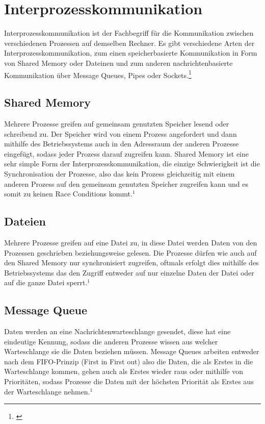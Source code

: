 \newpage
\section{Interprozesskommunikation}
Interprozesskommunikation ist der Fachbegriff für die Kommunikation zwischen verschiedenen Prozessen auf demselben Rechner. Es gibt verschiedene Arten der Interprozesskommunikation, zum einen speicherbasierte Kommunikation in Form von Shared Memory oder Dateinen und zum anderen nachrichtenbasierte Kommunikation über Message Queues, Pipes oder Sockets.\footnote[1]{\cite[Vgl.][]{30}} 


\subsection{Shared Memory}
Mehrere Prozesse greifen auf gemeinsam genutzten Speicher lesend oder schreibend zu. Der Speicher wird von einem Prozess angefordert und dann mithilfe des Betriebssystems auch in den Adressraum der anderen Prozesse eingefügt, sodass jeder Prozess darauf zugreifen kann. Shared Memory ist eine sehr simple Form der Interprozesskommunikation, die einzige Schwierigkeit ist die Synchronisation der Prozesse, also das kein Prozess gleichzeitig mit einem anderen Prozess auf den gemeinsam genutzten Speicher zugreifen kann und es somit zu keinen Race Conditions kommt.$^{1}$


\subsection{Dateien}
Mehrere Prozesse greifen auf eine Datei zu, in diese Datei werden Daten von den Prozessen geschrieben beziehungsweise gelesen. Die Prozesse dürfen wie auch auf den Shared Memory nur synchronisiert zugreifen, oftmals erfolgt dies mithilfe des Betriebssystems das den Zugriff entweder auf nur einzelne Daten der Datei oder auf die ganze Datei sperrt.$^{1}$

\subsection{Message Queue}
Daten werden an eine Nachrichtenwarteschlange gesendet, diese hat eine eindeutige Kennung, sodass die anderen Prozesse wissen aus welcher Warteschlange sie die Daten beziehen müssen. Message Queues arbeiten entweder nach dem FIFO-Prinzip (First in First out) also die Daten, die als Erstes in die Warteschlange kommen, gehen auch als Erstes wieder raus oder mithilfe von Prioritäten, sodass Prozesse die Daten mit der höchsten Priorität als Erstes aus der Warteschlange nehmen.$^{1}$ 

